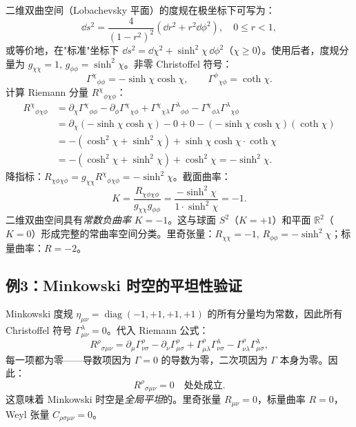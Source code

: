 二维双曲空间（Lobachevsky 平面）的度规在极坐标下可写为：
\begin{equation}
    \dd s^2 = \frac{4}{(1 - r^2)^2} (\dd r^2 + r^2 \dd\phi^2), \quad 0 \le r < 1,
\end{equation}
或等价地，在"标准"坐标下 $\dd s^2 = \dd\chi^2 + \sinh^2\chi \, \dd\phi^2$（$\chi \ge 0$）。使用后者，度规分量为 $g_{\chi\chi}=1$, $g_{\phi\phi}=\sinh^2\chi$。非零 Christoffel 符号：
\begin{equation}
    \Gamma^\chi{}_{\phi\phi} = -\sinh\chi\cosh\chi, \qquad \Gamma^\phi{}_{\chi\phi} = \coth\chi.
\end{equation}
计算 Riemann 分量 $R^\chi{}_{\phi\chi\phi}$：
\begin{align}
    R^\chi{}_{\phi\chi\phi} &= \partial_\chi \Gamma^\chi{}_{\phi\phi} - \partial_\phi \Gamma^\chi{}_{\chi\phi} + \Gamma^\chi{}_{\chi\lambda}\Gamma^\lambda{}_{\phi\phi} - \Gamma^\chi{}_{\phi\lambda}\Gamma^\lambda{}_{\chi\phi} \\
    &= \partial_\chi(-\sinh\chi\cosh\chi) - 0 + 0 - (-\sinh\chi\cosh\chi)(\coth\chi) \\
    &= -(\cosh^2\chi + \sinh^2\chi) + \sinh\chi\cosh\chi \cdot \coth\chi \\
    &= -(\cosh^2\chi + \sinh^2\chi) + \cosh^2\chi = -\sinh^2\chi.
\end{align}
降指标：$R_{\chi\phi\chi\phi} = g_{\chi\chi} R^\chi{}_{\phi\chi\phi} = -\sinh^2\chi$。截面曲率：
\begin{equation}
    K = \frac{R_{\chi\phi\chi\phi}}{g_{\chi\chi}g_{\phi\phi}} = \frac{-\sinh^2\chi}{1 \cdot \sinh^2\chi} = -1.
\end{equation}
二维双曲空间具有\emph{常数负曲率} $K = -1$。这与球面 $S^2$（$K = +1$）和平面 $\mathbb{R}^2$（$K = 0$）形成完整的常曲率空间分类。里奇张量：$R_{\chi\chi} = -1$, $R_{\phi\phi} = -\sinh^2\chi$；标量曲率：$R = -2$。

\subsection{例3：Minkowski 时空的平坦性验证}

Minkowski 度规 $\eta_{\mu\nu} = \operatorname{diag}(-1, +1, +1, +1)$ 的所有分量均为常数，因此所有 Christoffel 符号 $\Gamma^\lambda_{\mu\nu} = 0$。代入 Riemann 公式：
\begin{equation}
    R^\rho{}_{\sigma\mu\nu} = \partial_\mu \Gamma^\rho_{\nu\sigma} - \partial_\nu \Gamma^\rho_{\mu\sigma} + \Gamma^\rho_{\mu\lambda}\Gamma^\lambda_{\nu\sigma} - \Gamma^\rho_{\nu\lambda}\Gamma^\lambda_{\mu\sigma},
\end{equation}
每一项都为零——导数项因为 $\Gamma = 0$ 的导数为零，二次项因为 $\Gamma$ 本身为零。因此：
\begin{equation}
    \boxed{R^\rho{}_{\sigma\mu\nu} = 0 \quad \text{处处成立}}.
\end{equation}
这意味着 Minkowski 时空是\emph{全局平坦}的。里奇张量 $R_{\mu\nu} = 0$，标量曲率 $R = 0$，Weyl 张量 $C_{\rho\sigma\mu\nu} = 0$。

